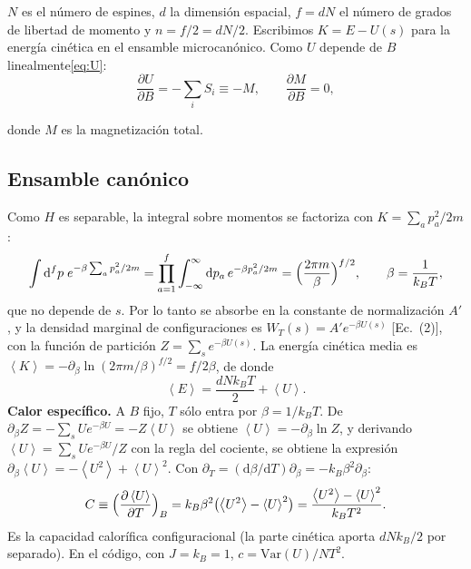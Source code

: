 \documentclass[11pt,letterpaper]{article}
\newcommand{\avg}[1]{\left\langle #1 \right\rangle}
\newcommand{\kB}{k_{B}}
\newcommand{\dd}{\mathrm{d}}
\begin{document}
$N$ es el número de espines, $d$ la dimensión espacial, $f=dN$ el número de grados de
libertad de momento y $n=f/2=dN/2$. Escribimos $K=E-U(s)$ para la energía cinética
en el ensamble microcanónico. Como $U$ depende de $B$ linealmente\eqref{eq:U}:
\begin{equation}
\frac{\partial U}{\partial B}=-\sum_iS_i\equiv-M,\qquad \frac{\partial M}{\partial B}=0 ,
\label{eq:dUdB}
\end{equation}

donde $M$ es la magnetización total. 

\subsection{Ensamble canónico}
Como $H$ es separable, la integral sobre momentos se factoriza con $K=\sum_a p_a^2/2m$:
\begin{equation}
\int\dd^{f}p\;e^{-\beta\sum_a p_a^2/2m}=\prod_{a=1}^{f}\int_{-\infty}^{\infty}\dd p_a\,
e^{-\beta p_a^2/2m}=\Bigl(\frac{2\pi m}{\beta}\Bigr)^{f/2},\qquad\beta=\frac1{\kB T},
\end{equation}
que no depende de $s$. Por lo tanto se absorbe en la constante de normalización $A'$, y la densidad marginal de configuraciones es
$W_T(s)=A'e^{-\beta U(s)}$ [Ec.~(2)], con la función de partición
$Z=\sum_s e^{-\beta U(s)}$. La energía
cinética media es
$\avg K=-\partial_\beta\ln(2\pi m/\beta)^{f/2}=f/2\beta$, de donde
\begin{equation}
\avg E=\frac{dN\kB T}{2}+\avg U .
\label{eq:E-can}
\end{equation}
\textbf{Calor específico.} A $B$ fijo, $T$ sólo entra por $\beta=1/\kB T$. De
$\partial_\beta Z=-\sum_sUe^{-\beta U}=-Z\avg U$ se obtiene $\avg U=-\partial_\beta\ln Z$, y
derivando $\avg U=\sum_sUe^{-\beta U}/Z$ con la regla del cociente, se obtiene la expresión
$\partial_\beta\avg U=-\avg{U^2}+\avg U^2$. Con $\partial_T=(\dd\beta/\dd T)\partial_\beta=-\kB\beta^2\partial_\beta$:
\begin{equation}
C\equiv\Bigl(\frac{\partial\avg U}{\partial T}\Bigr)_B
=\kB\beta^2\bigl(\avg{U^2}-\avg U^2\bigr)
=\frac{\avg{U^2}-\avg U^2}{\kB T^2}.
\label{eq:C-can}
\end{equation}
Es la capacidad calorífica configuracional (la parte cinética aporta $dN\kB/2$ por
separado). En el código, con $J=\kB=1$, $c=\mathrm{Var}(U)/NT^2$.
\end{document}
